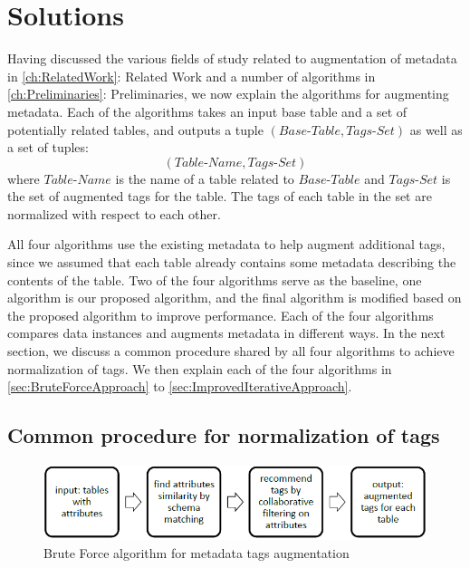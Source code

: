 
\chapter{Solutions}
\label{ch:Solutions}

Having discussed the various fields of study related to augmentation of metadata in \autoref{ch:RelatedWork}: Related Work and a number of algorithms in \autoref{ch:Preliminaries}: Preliminaries, we now explain the algorithms for augmenting metadata. Each of the algorithms takes an input base table and a set of potentially related tables, and outputs a tuple $(\textit{Base-Table}, \textit{Tags-Set})$ as well as a set of tuples:
\[
(\textit{Table-Name},\textit{Tags-Set})
\]
where $\textit{Table-Name}$ is the name of a table related to $\textit{Base-Table}$ and $\textit{Tags-Set}$ is the set of augmented tags for the table. The tags of each table in the set are normalized with respect to each other.

All four algorithms use the existing metadata to help augment additional tags, since we assumed that each table already contains some metadata describing the contents of the table. Two of the four algorithms serve as the baseline, one algorithm is our proposed algorithm, and the final algorithm is modified based on the proposed algorithm to improve performance. Each of the four algorithms compares data instances and augments metadata in different ways. In the next section, we discuss a common procedure shared by all four algorithms to achieve normalization of tags. We then explain each of the four algorithms in \autoref{sec:BruteForceApproach} to \autoref{sec:ImprovedIterativeApproach}.

\section{Common procedure for normalization of tags}
\label{sec:CommonProcedureForNormalizationOfTags}

\begin{figure}
    \centering
    \includegraphics[width=5in]{figures/brute-force-algorithm.png}
    \caption{Brute Force algorithm for metadata tags augmentation}
    \label{fig:brute-force-algorithm}
\end{figure}

